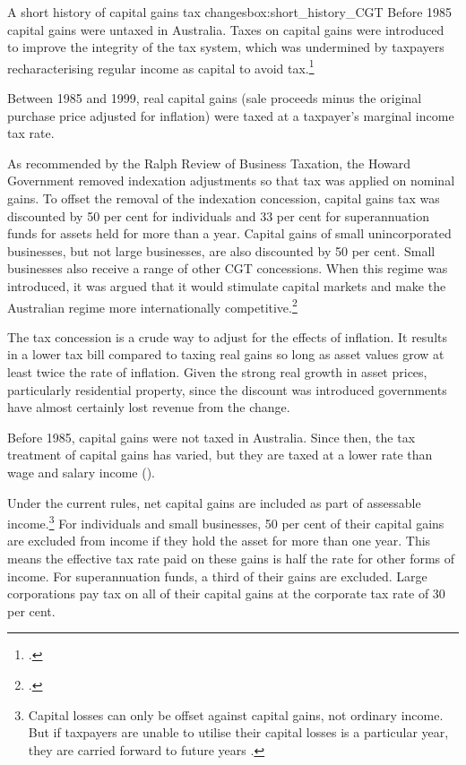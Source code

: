 \documentclass{grattan}\usepackage[]{graphicx}\usepackage[]{color}
\begin{document}
\begin{smallbox}{A short history of capital gains tax changes}{box:short_history_CGT}
Before 1985 capital gains were untaxed in Australia. Taxes on capital gains were introduced to improve the integrity of the tax system, which was undermined by taxpayers recharacterising regular income as capital to avoid tax.\footcites{Evans2005}{Kenny2005}

Between 1985 and 1999, real capital gains (sale proceeds minus the original purchase price adjusted for inflation) were taxed at a taxpayer's marginal income tax rate. 

As recommended by the Ralph Review of Business Taxation, the Howard Government removed indexation adjustments so that tax was applied on nominal gains. To offset the removal of the indexation concession, capital gains tax was discounted by 50 per cent for individuals and 33 per cent for superannuation funds for assets held for more than a year. Capital gains of small unincorporated businesses, but not large businesses, are also discounted by 50 per cent. Small businesses also receive a range of other CGT concessions. When this regime was introduced, it was argued that it would stimulate capital markets and make the Australian regime more internationally competitive.\footcite[p.~14, 598]{BusinessTaxation1999} 

The tax concession is a crude way to adjust for the effects of inflation. It results in a lower tax bill compared to taxing real gains so long as asset values grow at least twice the rate of inflation. Given the strong real growth in asset prices, particularly residential property, since the discount was introduced governments have almost certainly lost revenue from the change.

\end{smallbox}
Before 1985, capital gains were not taxed in Australia. Since then, the tax treatment of capital gains has varied, but they are taxed at a lower rate than wage and salary income ().  

Under the current rules, net capital gains are included as part of assessable income.\footnote{Capital losses can only be offset against capital gains, not ordinary income. But if taxpayers are unable to utilise their capital losses is a particular year, they are carried forward to future years \textcite{ATO2014a}.}  For individuals and small businesses, 50 per cent of their capital gains are excluded from income if they hold the asset for more than one year. This means the effective tax rate paid on these gains is half the rate for other forms of income. For superannuation funds, a third of their gains are excluded. Large corporations pay tax on all of their capital gains at the corporate tax rate of 30 per cent.
\end{document}
